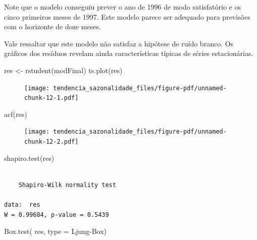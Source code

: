\documentclass[
  letterpaper,
  DIV=11,
  numbers=noendperiod]{scrartcl}
\newenvironment{Shaded}{\begin{snugshade}}{\end{snugshade}}
\newcommand{\AttributeTok}[1]{\textcolor[rgb]{0.40,0.45,0.13}{#1}}
\newcommand{\FunctionTok}[1]{\textcolor[rgb]{0.28,0.35,0.67}{#1}}
\newcommand{\NormalTok}[1]{\textcolor[rgb]{0.00,0.23,0.31}{#1}}
\newcommand{\OtherTok}[1]{\textcolor[rgb]{0.00,0.23,0.31}{#1}}
\newcommand{\StringTok}[1]{\textcolor[rgb]{0.13,0.47,0.30}{#1}}
\theoremstyle{plain}
\theoremstyle{plain}
\theoremstyle{definition}
\theoremstyle{definition}
\theoremstyle{remark}
\begin{document}
Note que o modelo conseguiu prever o ano de 1996 de modo satisfatório e
os cinco primeiros meses de 1997. Este modelo parece ser adequado para
previsões com o horizonte de doze meses.

Vale ressaltar que este modelo não satisfaz a hipótese de ruído branco.
Os gráficos dos resíduos revelam ainda características típicas de séries
estacionárias.

\begin{Shaded}
\begin{Highlighting}[]
\NormalTok{res }\OtherTok{\textless{}{-}} \FunctionTok{rstudent}\NormalTok{(modFinal)}
\FunctionTok{ts.plot}\NormalTok{(res)}
\end{Highlighting}
\end{Shaded}

\begin{figure}[H]

{\centering \texttt{[image: tendencia\_sazonalidade\_files/figure-pdf/unnamed-chunk-12-1.pdf]}

}

\end{figure}

\begin{Shaded}
\begin{Highlighting}[]
\FunctionTok{acf}\NormalTok{(res)}
\end{Highlighting}
\end{Shaded}

\begin{figure}[H]

{\centering \texttt{[image: tendencia\_sazonalidade\_files/figure-pdf/unnamed-chunk-12-2.pdf]}

}

\end{figure}

\begin{Shaded}
\begin{Highlighting}[]
\FunctionTok{shapiro.test}\NormalTok{(res)}
\end{Highlighting}
\end{Shaded}

\begin{verbatim}

    Shapiro-Wilk normality test

data:  res
W = 0.99684, p-value = 0.5439
\end{verbatim}

\begin{Shaded}
\begin{Highlighting}[]
\FunctionTok{Box.test}\NormalTok{( res, }\AttributeTok{type =} \StringTok{\textquotesingle{}Ljung{-}Box\textquotesingle{}}\NormalTok{)}
\end{Highlighting}
\end{Shaded}
\end{document}
